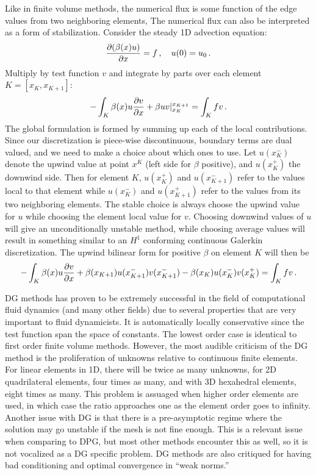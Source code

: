 \documentclass[Dissertation.tex]{subfiles}
\begin{document}
Like in finite volume methods, the numerical flux is some function of the edge values from two neighboring elements,
The numerical flux can also be interpreted as a form of stabilization\cite{DGStabilization}.
Consider the steady 1D advection equation:
\[
\frac{\partial(\beta(x)u)}{\partial x}=f\,,\quad u(0)=u_0\,.
\]
Multiply by test function $v$ and integrate by parts over each element $K=[x_K,x_{K+1}]$:
\[
-\int_K\beta(x)u\frac{\partial v}{\partial x}+\beta uv|_{x_K}^{x_{K+1}}=\int_K fv\,.
\]
The global formulation is formed by summing up each of the local contributions.
Since our discretization is piece-wise discontinuous, boundary terms are dual valued, and we need
to make a choice about which ones to use.
Let $u(x_K^-)$ denote the upwind value at point $x^K$ (left side for $\beta$ positive), and $u(x_K^+)$ the downwind side.
Then for element $K$, $u(x_K^+)$ and $u(x_{K+1}^-)$ refer to the values local to that element while $u(x_K^-)$ and $u(x_{K+1}^+)$ refer to the
values from its two neighboring elements.
The stable choice is always choose the upwind value for $u$ while choosing the element local value for $v$.
Choosing downwind values of $u$ will give an unconditionally unstable method, while choosing average values will result in something similar
to an $H^1$ conforming continuous Galerkin discretization\cite{DGStabilization}.
The upwind bilinear form for positive $\beta$ on element $K$ will then be
\[
-\int_K\beta(x)u\frac{\partial v}{\partial x}+\beta(x_{K+1})u(x_{K+1}^-)v(x_{K+1}^-)-\beta(x_K)u(x_K^-)v(x_K^+)=\int_K fv\,.
\]

DG methods has proven to be extremely successful in the field of computational fluid dynamics (and many other fields) due
to several properties that are very important to fluid dynamicists.
It is automatically locally conservative since the test function span the space of constants.
The lowest order case is identical to first order finite volume methods.
However, the most audible criticism of the DG method is the proliferation of unknowns relative to continuous finite elements.
For linear elements in 1D, there will be twice as many unknowns, for 2D quadrilateral elements, four times as many, and with 3D hexahedral elements, eight
times as many.
This problem is assuaged when higher order elements are used, in which case the ratio approaches one as the element order goes to infinity.
Another issue with DG is that there is a pre-asymptotic regime where the solution may go unstable if the mesh is not fine enough.
This is a relevant issue when comparing to DPG, but most other methods encounter this as well, so it is not vocalized as a DG specific problem.
DG methods are also critiqued for having bad conditioning and optimal convergence in ``weak norms.''
\end{document}
